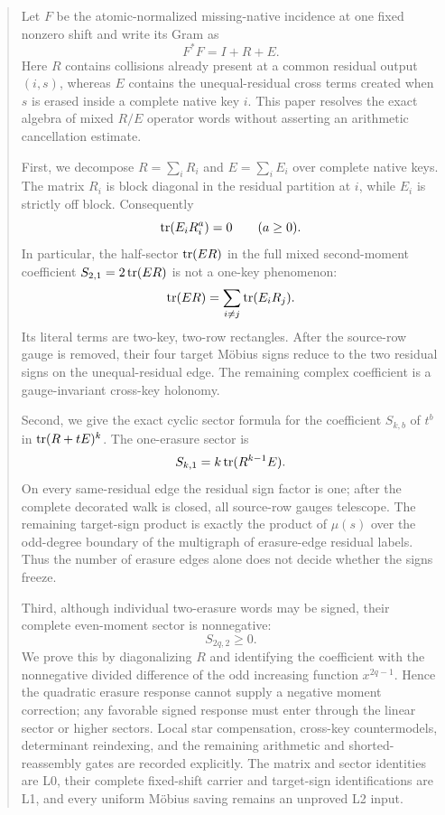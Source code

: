 \begin{abstract}
Let \(F\) be the atomic-normalized missing-native incidence at one fixed
nonzero shift and write its Gram as
\[
 F^*F=I+R+E.
\]
Here \(R\) contains collisions already present at a common residual output
\((i,s)\), whereas \(E\) contains the unequal-residual cross terms created
when \(s\) is erased inside a complete native key \(i\).  This paper
resolves the exact algebra of mixed \(R/E\) operator words without asserting
an arithmetic cancellation estimate.

First, we decompose \(R=\sum_iR_i\) and \(E=\sum_iE_i\) over complete native
keys.  The matrix \(R_i\) is block diagonal in the residual partition at
\(i\), while \(E_i\) is strictly off block.  Consequently
\[
 \tr(E_iR_i^a)=0\qquad(a\ge0).
\]
In particular, the half-sector \(\tr(ER)\) in the full mixed
second-moment coefficient \(S_{2,1}=2\tr(ER)\) is not a one-key
phenomenon:
\[
 \tr(ER)=\sum_{i\ne j}\tr(E_iR_j).
\]
Its literal terms are two-key, two-row rectangles.  After the source-row
gauge is removed, their four target Möbius signs reduce to the two residual
signs on the unequal-residual edge.  The remaining complex coefficient is
a gauge-invariant cross-key holonomy.

Second, we give the exact cyclic sector formula for the coefficient
\(S_{k,b}\) of \(t^b\) in
\(\tr(R+tE)^k\).  The one-erasure sector is
\[
 S_{k,1}=k\tr(R^{k-1}E).
\]
On every same-residual edge the residual sign factor is one; after the
complete decorated walk is closed, all source-row gauges telescope.  The
remaining target-sign product is exactly the product of \(\mu(s)\) over
the odd-degree boundary of the multigraph of erasure-edge residual labels.
Thus the number of erasure edges alone does not decide whether the signs
freeze.

Third, although individual two-erasure words may be signed, their complete
even-moment sector is nonnegative:
\[
 S_{2q,2}\ge0.
\]
We prove this by diagonalizing \(R\) and identifying the coefficient with
the nonnegative divided difference of the odd increasing function
\(x^{2q-1}\).  Hence the quadratic erasure response cannot supply a negative
moment correction; any favorable signed response must enter through the
linear sector or higher sectors.  Local star compensation, cross-key
countermodels, determinant reindexing, and the remaining arithmetic and
shorted-reassembly gates are recorded explicitly.  The matrix and sector
identities are L0, their complete fixed-shift carrier and target-sign
identifications are L1, and every uniform Möbius saving remains an unproved
L2 input.
\end{abstract}
